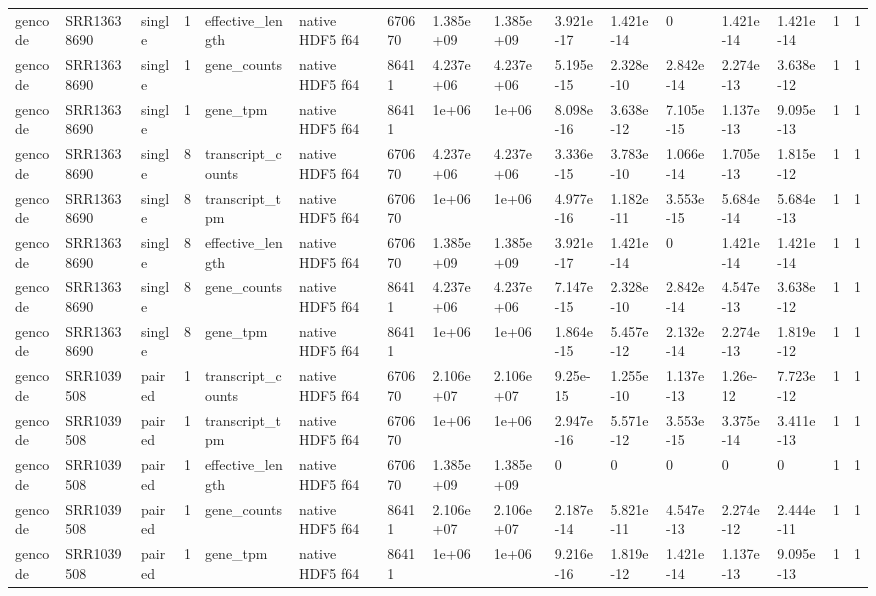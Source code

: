 \begin{tabular}{llllllllllllllll}
gencode & SRR13638690 & single & 1 & effective\_length & native HDF5 f64 & 670670 & 1.385e+09 & 1.385e+09 & 3.921e-17 & 1.421e-14 & 0 & 1.421e-14 & 1.421e-14 & 1 & 1 \\
gencode & SRR13638690 & single & 1 & gene\_counts & native HDF5 f64 & 86411 & 4.237e+06 & 4.237e+06 & 5.195e-15 & 2.328e-10 & 2.842e-14 & 2.274e-13 & 3.638e-12 & 1 & 1 \\
gencode & SRR13638690 & single & 1 & gene\_tpm & native HDF5 f64 & 86411 & 1e+06 & 1e+06 & 8.098e-16 & 3.638e-12 & 7.105e-15 & 1.137e-13 & 9.095e-13 & 1 & 1 \\
gencode & SRR13638690 & single & 8 & transcript\_counts & native HDF5 f64 & 670670 & 4.237e+06 & 4.237e+06 & 3.336e-15 & 3.783e-10 & 1.066e-14 & 1.705e-13 & 1.815e-12 & 1 & 1 \\
gencode & SRR13638690 & single & 8 & transcript\_tpm & native HDF5 f64 & 670670 & 1e+06 & 1e+06 & 4.977e-16 & 1.182e-11 & 3.553e-15 & 5.684e-14 & 5.684e-13 & 1 & 1 \\
gencode & SRR13638690 & single & 8 & effective\_length & native HDF5 f64 & 670670 & 1.385e+09 & 1.385e+09 & 3.921e-17 & 1.421e-14 & 0 & 1.421e-14 & 1.421e-14 & 1 & 1 \\
gencode & SRR13638690 & single & 8 & gene\_counts & native HDF5 f64 & 86411 & 4.237e+06 & 4.237e+06 & 7.147e-15 & 2.328e-10 & 2.842e-14 & 4.547e-13 & 3.638e-12 & 1 & 1 \\
gencode & SRR13638690 & single & 8 & gene\_tpm & native HDF5 f64 & 86411 & 1e+06 & 1e+06 & 1.864e-15 & 5.457e-12 & 2.132e-14 & 2.274e-13 & 1.819e-12 & 1 & 1 \\
gencode & SRR1039508 & paired & 1 & transcript\_counts & native HDF5 f64 & 670670 & 2.106e+07 & 2.106e+07 & 9.25e-15 & 1.255e-10 & 1.137e-13 & 1.26e-12 & 7.723e-12 & 1 & 1 \\
gencode & SRR1039508 & paired & 1 & transcript\_tpm & native HDF5 f64 & 670670 & 1e+06 & 1e+06 & 2.947e-16 & 5.571e-12 & 3.553e-15 & 3.375e-14 & 3.411e-13 & 1 & 1 \\
gencode & SRR1039508 & paired & 1 & effective\_length & native HDF5 f64 & 670670 & 1.385e+09 & 1.385e+09 & 0 & 0 & 0 & 0 & 0 & 1 & 1 \\
gencode & SRR1039508 & paired & 1 & gene\_counts & native HDF5 f64 & 86411 & 2.106e+07 & 2.106e+07 & 2.187e-14 & 5.821e-11 & 4.547e-13 & 2.274e-12 & 2.444e-11 & 1 & 1 \\
gencode & SRR1039508 & paired & 1 & gene\_tpm & native HDF5 f64 & 86411 & 1e+06 & 1e+06 & 9.216e-16 & 1.819e-12 & 1.421e-14 & 1.137e-13 & 9.095e-13 & 1 & 1 \\

\end{tabular}
